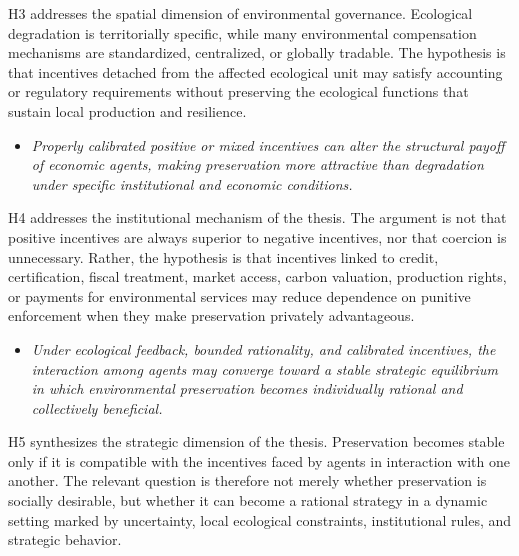 H3 addresses the spatial dimension of environmental governance. Ecological degradation is territorially specific, while many environmental compensation mechanisms are standardized, centralized, or globally tradable. The hypothesis is that incentives detached from the affected ecological unit may satisfy accounting or regulatory requirements without preserving the ecological functions that sustain local production and resilience.

\begin{itemize}

    \item[\textbf{H4.}]
    
    \textit{Properly calibrated positive or mixed incentives can alter the structural payoff of economic agents, making preservation more attractive than degradation under specific institutional and economic conditions.}

\end{itemize}

H4 addresses the institutional mechanism of the thesis. The argument is not that positive incentives are always superior to negative incentives, nor that coercion is unnecessary. Rather, the hypothesis is that incentives linked to credit, certification, fiscal treatment, market access, carbon valuation, production rights, or payments for environmental services may reduce dependence on punitive enforcement when they make preservation privately advantageous.

\begin{itemize}

    \item[\textbf{H5.}]
    
    \textit{Under ecological feedback, bounded rationality, and calibrated incentives, the interaction among agents may converge toward a stable strategic equilibrium in which environmental preservation becomes individually rational and collectively beneficial.}

\end{itemize}

H5 synthesizes the strategic dimension of the thesis. Preservation becomes stable only if it is compatible with the incentives faced by agents in interaction with one another. The relevant question is therefore not merely whether preservation is socially desirable, but whether it can become a rational strategy in a dynamic setting marked by uncertainty, local ecological constraints, institutional rules, and strategic behavior.


